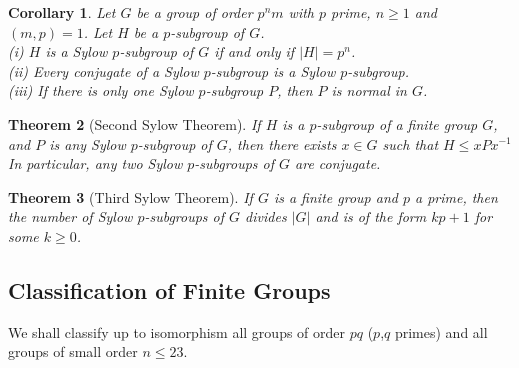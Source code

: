 \documentclass[leqno,DIV=calc,paper=a4,fontsize=11pt]{article}
\newtheorem{thm}{Theorem}[section]
\newtheorem{cor}[thm]{Corollary}
\theoremstyle{definition}
\theoremstyle{plain}
\theoremstyle{remark}
\begin{document}
\begin{cor}
Let $G$ be a group of order $p^nm$ with $p$ prime, $n\geq1$ and $(m,p) = 1$. Let $H$ be a $p$-subgroup of $G$.\\
(i) $H$ is a Sylow $p$-subgroup of $G$ if and only if $|H| = p^n$.\\
(ii) Every conjugate of a Sylow $p$-subgroup is a Sylow $p$-subgroup.\\
(iii) If there is only one Sylow $p$-subgroup $P$, then $P$ is normal in $G$.
\end{cor}

\begin{thm}[Second Sylow Theorem] If $H$ is a $p$-subgroup of a finite group $G$, and $P$ is any Sylow $p$-subgroup of $G$, then there exists $x\in G$ such that $H\leq xPx^{-1}$ In particular, any two Sylow $p$-subgroups of $G$ are conjugate.
\end{thm}

\begin{thm}[Third Sylow Theorem] If $G$ is a finite group and $p$ a prime, then the number of Sylow $p$-subgroups of $G$ divides $|G|$ and is of the form $kp + 1$ for some $k\geq 0$.
\end{thm}

\subsection{Classification of Finite Groups}

We shall classify up to isomorphism all groups of order $pq$ ($p$,$q$ primes) and all groups of small order $n\leq 23$.
\end{document}
